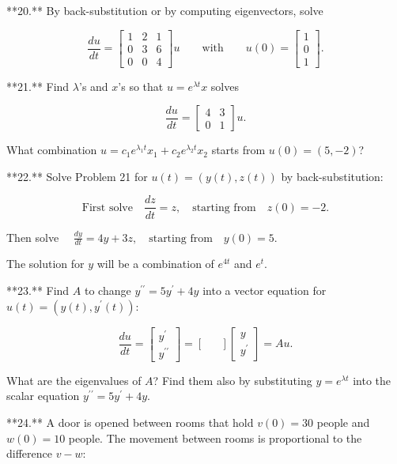 

**20.** By back-substitution or by computing eigenvectors, solve

\[\frac{du}{dt}=\begin{bmatrix}1&2&1\\ 0&3&6\\ 0&0&4\end{bmatrix}u\qquad\text{with}\qquad u(0)=\begin{bmatrix}1\\ 0\\ 1\end{bmatrix}.\]

**21.** Find \(\lambda\)'s and \(x\)'s so that \(u=e^{\lambda t}x\) solves

\[\frac{du}{dt}=\begin{bmatrix}4&3\\ 0&1\end{bmatrix}u.\]

What combination \(u=c_{1}e^{\lambda_{1}t}x_{1}+c_{2}e^{\lambda_{2}t}x_{2}\) starts from \(u(0)=(5,-2)\)?

**22.** Solve Problem 21 for \(u(t)=(y(t),z(t))\) by back-substitution:

\[\text{First solve}\quad\frac{dz}{dt}=z,\quad\text{starting from}\quad z(0)=-2.\]

Then solve \(\quad\frac{dy}{dt}=4y+3z,\quad\text{starting from}\quad y(0)=5.\)

The solution for \(y\) will be a combination of \(e^{4t}\) and \(e^{t}\).

**23.** Find \(A\) to change \(y^{\prime\prime}=5y^{\prime}+4y\) into a vector equation for \(u(t)=(y(t),y^{\prime}(t))\):

\[\frac{du}{dt}=\begin{bmatrix}y^{\prime}\\ y^{\prime\prime}\end{bmatrix}=\begin{bmatrix}&\end{bmatrix}\begin{bmatrix}y\\ y^{\prime}\end{bmatrix}=Au.\]

What are the eigenvalues of \(A\)? Find them also by substituting \(y=e^{\lambda t}\) into the scalar equation \(y^{\prime\prime}=5y^{\prime}+4y\).

**24.** A door is opened between rooms that hold \(v(0)=30\) people and \(w(0)=10\) people. The movement between rooms is proportional to the difference \(v-w\):


